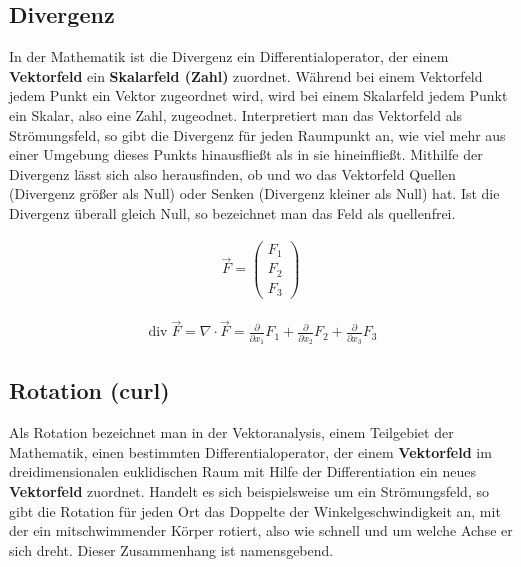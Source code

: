 \documentclass[a4paper, 10pt]{scrartcl}
\begin{document}
		\subsection{Divergenz}
		In der Mathematik ist die Divergenz ein Differentialoperator, der einem
		\textbf{Vektorfeld} ein \textbf{Skalarfeld (Zahl)} zuordnet. Während bei einem
		Vektorfeld jedem Punkt ein Vektor zugeordnet wird, wird bei einem Skalarfeld jedem Punkt ein Skalar, also
		eine Zahl, zugeodnet. Interpretiert man das Vektorfeld als Strömungsfeld, so
		gibt die Divergenz für jeden Raumpunkt an, wie viel mehr aus einer Umgebung
		dieses Punkts hinausfließt als in sie hineinfließt. Mithilfe der Divergenz lässt
		sich also herausfinden, ob und wo das Vektorfeld Quellen (Divergenz größer als
		Null) oder Senken (Divergenz kleiner als Null) hat. Ist die Divergenz überall
		gleich Null, so bezeichnet man das Feld als quellenfrei.
		
		\begin{align}
			\vec F = \begin{pmatrix} F_1 \\ F_2 \\ F_3 \end{pmatrix}
		\end{align}
		
		\begin{align}
			\operatorname{div}\vec F = \nabla \cdot \vec F =
			\frac{\partial}{\partial x_1}F_1 + \frac{\partial}{\partial x_2}F_2+ \frac{\partial}{\partial x_3}F_3
		\end{align}
		
		\subsection{Rotation (curl)}
		Als Rotation bezeichnet man in der Vektoranalysis, einem Teilgebiet der
		Mathematik, einen bestimmten Differentialoperator, der einem \textbf{Vektorfeld}
		im dreidimensionalen euklidischen Raum mit Hilfe der Differentiation ein neues
		\textbf{Vektorfeld} zuordnet. Handelt es sich beispielsweise um ein
		Strömungsfeld, so gibt die Rotation für jeden Ort das Doppelte der Winkelgeschwindigkeit an, mit
		der ein mitschwimmender Körper rotiert, also wie schnell und um welche Achse er
		sich dreht. Dieser Zusammenhang ist namensgebend.
		
\end{document}
